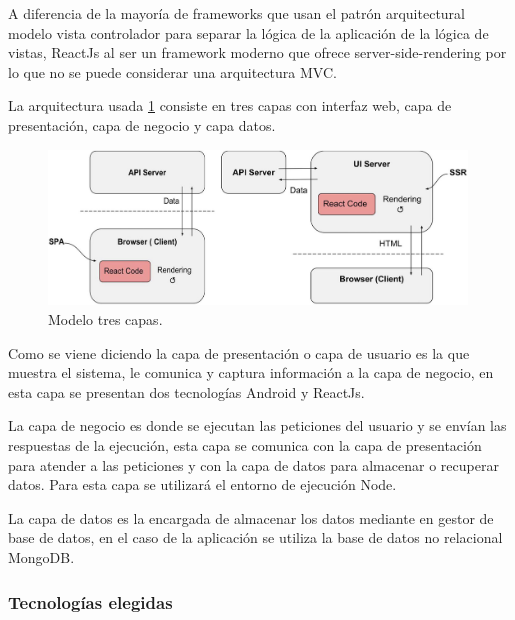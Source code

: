 \documentclass{article}
\begin{document}

A diferencia de la mayoría de frameworks que usan el patrón arquitectural modelo vista controlador para separar la lógica de la aplicación de la lógica de vistas, ReactJs al ser un framework moderno que ofrece server-side-rendering por lo que no se puede considerar una arquitectura MVC.
 
La arquitectura usada \ref{patron} consiste en tres capas con interfaz web, capa de presentación, capa de negocio y capa datos.

\begin{figure}[H]
    \centering
        \includegraphics[width=0.99\textwidth]{../images/patron.jpg}
    \caption{Modelo tres capas.}
    \label{patron}
\end{figure}

Como se viene diciendo la capa de presentación o capa de usuario es la que muestra el sistema, le comunica y captura información a la capa de negocio, en esta capa se presentan dos tecnologías Android y ReactJs.
 
La capa de negocio es donde se ejecutan las peticiones del usuario y se envían las respuestas de la ejecución, esta capa se comunica con la capa de presentación para atender a las peticiones y con la capa de datos para almacenar o recuperar datos. Para esta capa se utilizará el entorno de ejecución Node.
 
La capa de datos es la encargada de almacenar los datos mediante en gestor de base de datos, en el caso de la aplicación se utiliza la base de datos no relacional MongoDB.






\subsubsection*{Tecnologías elegidas}


\end{document}
